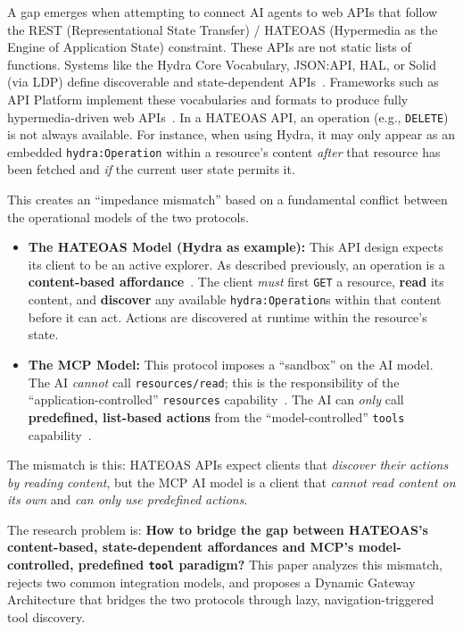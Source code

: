 \documentclass[11pt,a4paper]{article}
\begin{document}
A gap emerges when attempting to connect AI agents to web APIs that follow the REST (Representational State Transfer) / HATEOAS (Hypermedia as the Engine of Application State) constraint. These APIs are not static lists of functions. Systems like the Hydra Core Vocabulary, JSON:API, HAL, or Solid (via LDP) define discoverable and state-dependent APIs~\cite{hydra,jsonapi,hal,solid}. Frameworks such as API Platform implement these vocabularies and formats to produce fully hypermedia-driven web APIs~\cite{api-platform}. In a HATEOAS API, an operation (e.g., \texttt{DELETE}) is not always available. For instance, when using Hydra, it may only appear as an embedded \texttt{hydra:Operation} within a resource's content \emph{after} that resource has been fetched and \emph{if} the current user state permits it.

This creates an ``impedance mismatch'' based on a fundamental conflict between the operational models of the two protocols.

\begin{itemize}
  \item \textbf{The HATEOAS Model (Hydra as example):} This API design expects its client to be an active explorer. As described previously, an operation is a \textbf{content-based affordance}~\cite{hydra}. The client \emph{must} first \texttt{GET} a resource, \textbf{read} its content, and \textbf{discover} any available \texttt{hydra:Operation}s within that content before it can act. Actions are discovered at runtime within the resource's state.
  \item \textbf{The MCP Model:} This protocol imposes a ``sandbox'' on the AI model. The AI \emph{cannot} call \texttt{resources/read}; this is the responsibility of the ``application-controlled'' \texttt{resources} capability~\cite{mcp-resources}. The AI can \emph{only} call \textbf{predefined, list-based actions} from the ``model-controlled'' \texttt{tools} capability~\cite{mcp-tools}.
\end{itemize}

The mismatch is this: HATEOAS APIs expect clients that \emph{discover their actions by reading content}, but the MCP AI model is a client that \emph{cannot read content on its own} and \emph{can only use predefined actions}.

The research problem is: \textbf{How to bridge the gap between HATEOAS's content-based, state-dependent affordances and MCP's model-controlled, predefined \texttt{tool} paradigm?} This paper analyzes this mismatch, rejects two common integration models, and proposes a Dynamic Gateway Architecture that bridges the two protocols through lazy, navigation-triggered tool discovery.
\end{document}
